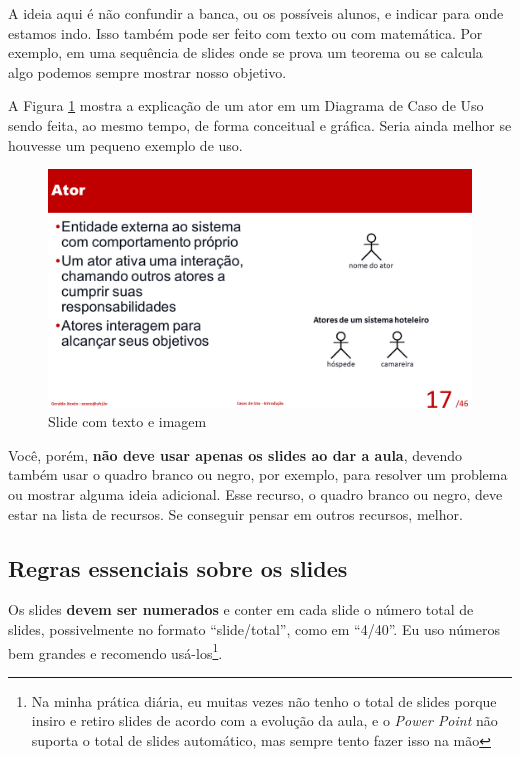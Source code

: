 \documentclass{article}
\def\tam{0.5}
\begin{document}
A ideia aqui é não confundir a banca, ou os possíveis alunos, e indicar para onde estamos indo. Isso também pode ser feito com texto ou com matemática.
Por exemplo, em uma sequência de slides onde se prova um teorema ou se calcula algo podemos sempre mostrar nosso objetivo.

A Figura \ref{fig:teximag} mostra a explicação de um ator em um Diagrama de Caso de Uso sendo feita, ao mesmo tempo, de forma conceitual e gráfica. Seria ainda melhor se houvesse um pequeno exemplo de uso.

\begin{figure}[hbt]
    \centering
    \includegraphics[width=\tam\linewidth]{imagens/slidecomimage.png}
    \caption{Slide com texto e imagem}
    \label{fig:teximag}
\end{figure}

Você, porém, \textbf{não deve usar apenas os slides ao dar a aula}, devendo também usar o quadro branco ou negro, por exemplo, para resolver um problema ou mostrar alguma ideia adicional. Esse recurso, o quadro branco ou negro, deve estar na lista de recursos. Se conseguir pensar em outros recursos, melhor.


\subsection{Regras essenciais sobre os slides}

Os slides \textbf{devem ser numerados} e conter em cada slide o número total de slides, possivelmente no formato ``slide/total'', como em ``4/40''.
Eu uso números bem grandes e recomendo usá-los\footnote{Na minha prática diária, eu muitas vezes não tenho o total de slides porque insiro e retiro slides de acordo com a evolução da aula, e o \textit{Power Point} não suporta o  total de slides automático, mas sempre tento fazer isso na mão}.
\end{document}
